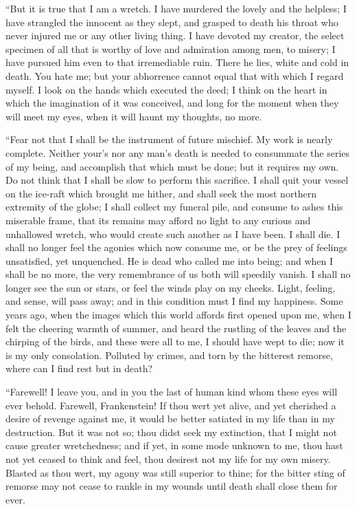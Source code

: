 ``But it is true that I am a wretch.
I have murdered the lovely and the
helpless; I have strangled the innocent
as they slept, and grasped to death
his throat who never injured me or
any other living thing. I have devoted
my creator, the select specimen of all
that is worthy of love and admiration
among men, to misery; I have pursued
him even to that irremediable ruin.
There he lies, white and cold in death.
You hate me; but your abhorrence
cannot equal that with which I regard
myself. I look on the hands which
executed the deed; I think on the
heart in which the imagination of it
was conceived, and long for the moment
when they will meet my eyes,
when it will haunt my thoughts, no
more.

``Fear not that I shall be the instrument
of future mischief. My work is
nearly complete. Neither your's nor
any man's death is needed to consummate
the series of my being, and accomplish
that which must be done;
but it requires my own. Do not think
that I shall be slow to perform this sacrifice.
I shall quit your vessel on the
ice-raft which brought me hither, and
shall seek the most northern extremity
of the globe; I shall collect my funeral
pile, and consume to ashes this miserable
frame, that its remains may
afford no light to any curious and unhallowed
wretch, who would create
such another as I have been. I shall
die. I shall no longer feel the agonies
which now consume me, or be the
prey of feelings unsatisfied, yet unquenched.
He is dead who called me
into being; and when I shall be no
more, the very remembrance of us
both will speedily vanish. I shall no
longer see the sun or stars, or feel the
winds play on my cheeks. Light, feeling,
and sense, will pass away; and in
this condition must I find my happiness.
Some years ago, when the
images which this world affords first
opened upon me, when I felt the cheering
warmth of summer, and heard the
rustling of the leaves and the chirping
of the birds, and these were all to me,
I should have wept to die; now it is
my only consolation. Polluted by
crimes, and torn by the bitterest remorse,
where can I find rest but in
death?

``Farewell! I leave you, and in you
the last of human kind whom these
eyes will ever behold. Farewell, Frankenstein!
If thou wert yet alive, and
yet cherished a desire of revenge against
me, it would be better satiated in my
life than in my destruction. But it was
not so; thou didst seek my extinction,
that I might not cause greater wretchedness;
and if yet, in some mode unknown
to me, thou hast not yet ceased
to think and feel, thou desirest not my
life for my own misery. Blasted as
thou wert, my agony was still superior
to thine; for the bitter sting of remorse
may not cease to rankle in my wounds
until death shall close them for ever.

